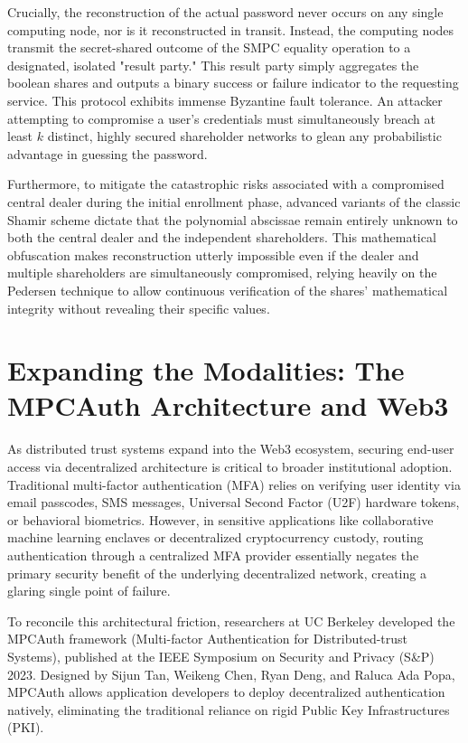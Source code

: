 \documentclass[11pt, a4paper]{article}
\begin{document}
Crucially, the reconstruction of the actual password never occurs on any single computing node, nor is it reconstructed in transit. Instead, the computing nodes transmit the secret-shared outcome of the SMPC equality operation to a designated, isolated "result party." This result party simply aggregates the boolean shares and outputs a binary success or failure indicator to the requesting service. This protocol exhibits immense Byzantine fault tolerance. An attacker attempting to compromise a user's credentials must simultaneously breach at least $k$ distinct, highly secured shareholder networks to glean any probabilistic advantage in guessing the password.

Furthermore, to mitigate the catastrophic risks associated with a compromised central dealer during the initial enrollment phase, advanced variants of the classic Shamir scheme dictate that the polynomial abscissae remain entirely unknown to both the central dealer and the independent shareholders. This mathematical obfuscation makes reconstruction utterly impossible even if the dealer and multiple shareholders are simultaneously compromised, relying heavily on the Pedersen technique to allow continuous verification of the shares' mathematical integrity without revealing their specific values.

\section*{Expanding the Modalities: The MPCAuth Architecture and Web3}
As distributed trust systems expand into the Web3 ecosystem, securing end-user access via decentralized architecture is critical to broader institutional adoption. Traditional multi-factor authentication (MFA) relies on verifying user identity via email passcodes, SMS messages, Universal Second Factor (U2F) hardware tokens, or behavioral biometrics. However, in sensitive applications like collaborative machine learning enclaves or decentralized cryptocurrency custody, routing authentication through a centralized MFA provider essentially negates the primary security benefit of the underlying decentralized network, creating a glaring single point of failure.

To reconcile this architectural friction, researchers at UC Berkeley developed the MPCAuth framework (Multi-factor Authentication for Distributed-trust Systems), published at the IEEE Symposium on Security and Privacy (S\&P) 2023. Designed by Sijun Tan, Weikeng Chen, Ryan Deng, and Raluca Ada Popa, MPCAuth allows application developers to deploy decentralized authentication natively, eliminating the traditional reliance on rigid Public Key Infrastructures (PKI).
\end{document}
